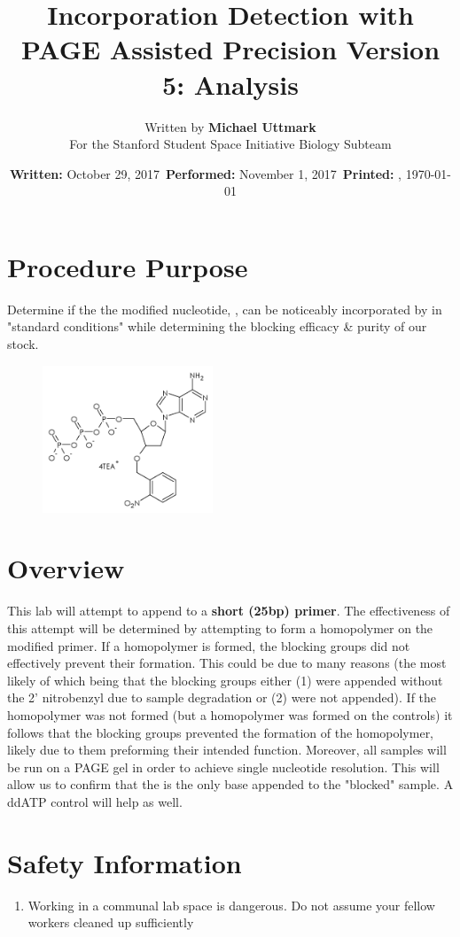 \documentclass{ssiBio}
\title{\BdATP{} Incorporation Detection with PAGE Assisted Precision Version 5: Analysis} %
\author{Written by \textbf{Michael Uttmark}\\ %
        For the Stanford Student Space Initiative Biology Subteam}
\date{\textbf{Written:} October 29, 2017 \,\textbf{Performed:} November 1, 2017 \,\textbf{Printed:} \currenttime{}, \today{}}
\begin{document}
\maketitle
\section{Procedure Purpose} %
Determine if the the modified nucleotide, \BdATP{}, can be noticeably incorporated by \tdt{} in "standard conditions" while determining the blocking efficacy \& purity of our \BdATP{} stock.
\begin{figure}[ht]
\centering
\includegraphics[width=2in]{./resources/BdATP-Structure.png}
\caption{\BdATP{}}
\label{bdatp}
\end{figure}
\section{Overview} %
This lab will attempt to append \BdATP{} to a \textbf{short (25bp) primer}. The effectiveness of this attempt will be determined by attempting to form a homopolymer on the modified primer. If a homopolymer is formed, the blocking groups did not effectively prevent their formation. This could be due to many reasons (the most likely of which being that the blocking groups either (1) were appended without the 2' nitrobenzyl due to sample degradation or (2) were not appended). If the homopolymer was not formed (but a homopolymer was formed on the controls) it follows that the blocking groups prevented the formation of the homopolymer, likely due to them preforming their intended function. Moreover, all samples will be run on a PAGE gel in order to achieve single nucleotide resolution. This will allow us to confirm that the \BdATP{} is the only base appended to the "blocked" sample. A ddATP control will help as well.

\section{Safety Information}
\begin{safety}
\begin{enumerate}
\SYBRGOLD{} %
\tdtSafety{} 
\tdtBufferSafety{}
\item{Working in a communal lab space is dangerous. Do not assume your fellow workers cleaned up sufficiently}
\end{enumerate}
\end{safety}
\end{document}
